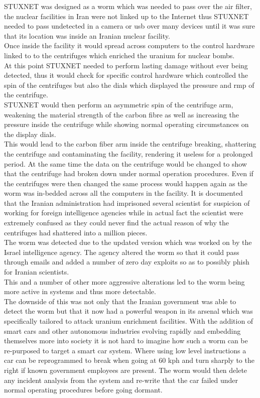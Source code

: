 \documentclass{article}
\begin{document}
STUXNET was designed as a worm which was needed to pass over the air filter, the nuclear facilities in Iran were not linked up to the Internet thus STUXNET needed to pass undetected in a camera or usb over many devices until it was sure that its location was inside an Iranian nuclear facility.\\
Once inside the facility it would spread across computers to the control hardware linked to to the centrifuges which enriched the uranium for nuclear bombs. \\
At this point STUXNET needed to perform lasting damage without ever being detected, thus it would check for specific control hardware which controlled the spin of the centrifuges but also the dials which displayed the pressure and rmp of the centrifuge.\\ STUXNET would then perform an asymmetric spin of the centrifuge arm, weakening  the material strength of the carbon fibre as well as increasing the pressure inside the centrifuge while showing normal operating circumstances on the display dials.\\
This would lead to the carbon fiber arm inside the centrifuge breaking, shattering the centrifuge and  contaminating the facility, rendering it useless for a prolonged period. At the same time the data on the centrifuge would be changed to show that the centrifuge had broken down under normal operation procedures. Even if the centrifuges were then changed the same process would happen again as the worm was in-bedded across all the computers in the facility. It is documented that the Iranian administration had imprisoned several scientist for suspicion of working for foreign intelligence agencies while in actual fact the scientist were extremely confused as they could never find the actual reason of why the centrifuges had shattered into a million pieces.\\
The worm was detected due to the updated version which was worked on by the Israel intelligence agency. The agency altered the worm so that it could pass through emails and added a number of zero day exploits so as to possibly phish for Iranian scientists. \\
This and a number of other more aggressive alterations led to the worm being more active in systems and thus more detectable. \\
The downside of this was not only that the Iranian government was able to detect the worm but that it now had a powerful weapon in its arsenal which was specifically tailored to attack uranium enrichment facilities. With the addition of smart cars and other autonomous industries evolving rapidly and embedding themselves more into society it is not hard to imagine how such a worm can be re-purposed to target a smart car system. Where using low level instructions a car can be reprogrammed to break when going at 60 kph and turn sharply to the right if known government employees are present. The worm would then delete any incident analysis from the system and re-write that the car failed under normal operating procedures before going dormant.\\
\end{document}
